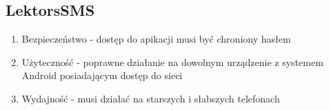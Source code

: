 \subsection{LektorsSMS}
\begin{enumerate}
	\item Bezpieczeństwo - dostęp do apikacji musi być chroniony hasłem
	\item Użyteczność - poprawne działanie na dowolnym urządzenie z systemem Android posiadającym dostęp do sieci
	\item Wydajność - musi działać na starszych i słabszych telefonach
\end{enumerate}


